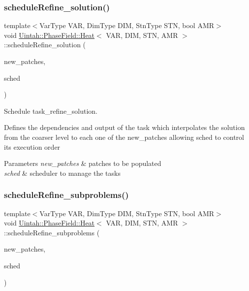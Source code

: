 \subsubsection{\texorpdfstring{schedule\+Refine\+\_\+solution()}{scheduleRefine\_solution()}}
{\footnotesize\ttfamily template$<$Var\+Type V\+AR, Dim\+Type D\+IM, Stn\+Type S\+TN, bool A\+MR$>$ \\
void \hyperlink{classUintah_1_1PhaseField_1_1Heat}{Uintah\+::\+Phase\+Field\+::\+Heat}$<$ V\+AR, D\+IM, S\+TN, A\+MR $>$\+::schedule\+Refine\+\_\+solution (\begin{DoxyParamCaption}\item[{const Patch\+Set $\ast$}]{new\+\_\+patches,  }\item[{SchedulerP \&}]{sched }\end{DoxyParamCaption})\hspace{0.3cm}{\ttfamily [protected]}}



Schedule task\+\_\+refine\+\_\+solution. 

Defines the dependencies and output of the task which interpolates the solution from the coarser level to each one of the new\+\_\+patches allowing sched to control its execution order


\begin{DoxyParams}{Parameters}
{\em new\+\_\+patches} & patches to be populated \\
\hline
{\em sched} & scheduler to manage the tasks \\
\hline
\end{DoxyParams}
\mbox{\label{classUintah_1_1PhaseField_1_1Heat_ae42ceecf972057940227ee62d22fe2bf}} 
\subsubsection{\texorpdfstring{schedule\+Refine\+\_\+subproblems()}{scheduleRefine\_subproblems()}}
{\footnotesize\ttfamily template$<$Var\+Type V\+AR, Dim\+Type D\+IM, Stn\+Type S\+TN, bool A\+MR$>$ \\
void \hyperlink{classUintah_1_1PhaseField_1_1Heat}{Uintah\+::\+Phase\+Field\+::\+Heat}$<$ V\+AR, D\+IM, S\+TN, A\+MR $>$\+::schedule\+Refine\+\_\+subproblems (\begin{DoxyParamCaption}\item[{const Patch\+Set $\ast$}]{new\+\_\+patches,  }\item[{SchedulerP \&}]{sched }\end{DoxyParamCaption})\hspace{0.3cm}{\ttfamily [protected]}}



